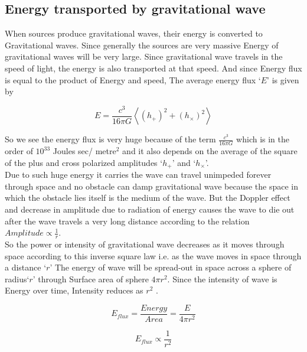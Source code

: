 \subsection{Energy transported by gravitational wave}

When sources produce gravitational waves, their energy is converted to Gravitational waves. Since generally the sources are very massive Energy of gravitational waves will be very large. Since gravitational wave travels in the speed of light, the energy is also transported at that speed. And since Energy flux is equal to the product of Energy and speed, The average energy flux `$E$' is given by \cite{1972ARA&A..10..335P}

\begin{equation}
    E = \frac{c^{3}}{16\pi G} \left \langle (h_{+})^{2} + (h_{\times})^{2} \right \rangle 
\end{equation}

So we see the energy flux is very huge because of the term $\frac{c^{3}}{16 \pi G}$ which is in the order of $10^{33}$ Joules sec/ metre$^2$  and it also depends on the average of the square of the plus and cross polarized amplitudes `$h_{+}$' and `$h_{\times}$'. \\

Due to such huge energy it carries the wave can travel unimpeded forever through space and no obstacle can damp gravitational wave because the space in which the obstacle lies itself is the medium of the wave. But the Doppler effect and decrease in amplitude due to radiation of energy causes the wave to die out after the wave travels a very long distance according to the relation $Amplitude \propto \frac{1}{r}$\:. 
\\

\noindent So the power or intensity of gravitational wave decreases as it moves through space according to this inverse square law i.e. as the wave moves in space through a distance `$r$' The energy of wave will be spread-out in space across a sphere of radius`$r$' through Surface area of sphere $4\pi r^2$. Since the intensity of wave is Energy over time, Intensity reduces as $r^2$ \cite{Obukhov_2009}.

\begin{equation*}
    E_{flux}= \frac{Energy}{Area} = \frac{E}{4\pi r^2}
\end{equation*}

\begin{equation*}
    E_{flux} \propto \frac{1}{r^2}
\end{equation*}

